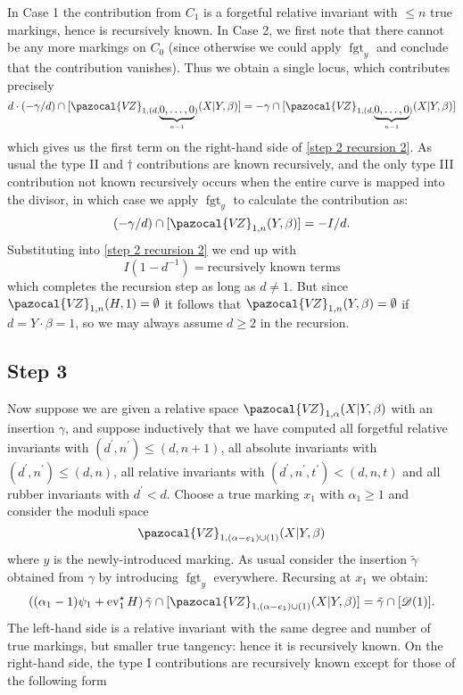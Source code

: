 \documentclass[11pt]{amsart}
\newcommand{\VZ}{\pazocal{V\!Z}}
\newcommand{\st}{\star}
\newcommand{\ev}{\operatorname{ev}}
\newcommand{\fgt}{\operatorname{fgt}}
\newcommand{\Dcal}{\mathcal{D}}
\theoremstyle{definition}
\theoremstyle{definition}
\providecommand{\DIFaddtex}[1]{{\protect\color{blue}\uwave{#1}}} %
\providecommand{\DIFaddbegin}{} %
\providecommand{\DIFaddend}{} %
\providecommand{\DIFadd}[1]{\texorpdfstring{\DIFaddtex{#1}}{#1}} %
\begin{document}
In Case 1 the contribution from $C_1$ is a forgetful relative invariant with $\leq n$ true markings, hence is recursively known. In Case 2, we first note that there cannot be any more markings on $C_0$ (since otherwise we could apply $\fgt_y$ and conclude that the contribution vanishes). Thus we obtain a single locus, which contributes precisely
\begin{equation*} d\cdot(-\gamma/d) \cap [\VZ_{1,(d,\underbrace{0,\ldots,0}_{n-1})}(X|Y,\beta)] = -\gamma\cap[\VZ_{1,(d,\underbrace{0,\ldots,0}_{n-1})}(X|Y,\beta)]\end{equation*}
which gives us the first term on the right-hand side of \eqref{step 2 recursion 2}. As usual the type II and $\dag$ contributions are known recursively, and the only type III contribution not known recursively occurs when the entire curve is mapped into the divisor, in which case we apply $\fgt_y$ to calculate the contribution as:
\begin{equation*} (-\gamma/d) \cap [\VZ_{1,n}(Y,\beta)] = -I/d.\end{equation*}
Substituting into \eqref{step 2 recursion 2} we end up with
\begin{equation*} I(1-d^{-1}) = \text{recursively known terms} \end{equation*}
which completes the recursion step as long as $d \neq 1$. But since $\VZ_{1,n}(H,1)=\emptyset$ \DIFaddbegin \DIFadd{as noted in Remark~\ref{rem: constant-maps}, }\DIFaddend it follows that $\VZ_{1,n}(Y,\beta)=\emptyset$ if $d=Y\cdot\beta=1$, so we may always assume $d \geq 2$ in the recursion.

\subsection*{Step 3} Now suppose we are given a relative space $\VZ_{1,\alpha}(X|Y,\beta)$ with an insertion $\gamma$, and suppose inductively that we have computed all forgetful relative invariants with $(d^\prime,n^\prime) \leq (d,n+1)$, all absolute invariants with $(d^\prime,n^\prime) \leq (d,n)$, all relative invariants with $(d^\prime,n^\prime,t^\prime)<(d,n,t)$ and all rubber invariants with $d^\prime < d$. Choose a true marking $x_1$ with $\alpha_1 \geq 1$ and consider the moduli space
\begin{equation*} \VZ_{1,(\alpha-e_1)\cup(1)}(X|Y,\beta) \end{equation*}
where $y$ is the newly-introduced marking. As usual consider the insertion $\tilde\gamma$ obtained from $\gamma$ by introducing $\fgt_y$ everywhere. Recursing at $x_1$ we obtain:
\begin{equation*} \left( (\alpha_1-1)\psi_1 + \ev_1^\st H\right) \tilde\gamma \cap [\VZ_{1,(\alpha-e_1)\cup(1)}(X|Y,\beta)] = \tilde\gamma \cap [\Dcal(1)].\end{equation*}
The left-hand side is a relative invariant with the same degree and number of true markings, but smaller true tangency: hence it is recursively known. On the right-hand side, the type I contributions are recursively known except for those of the following form
\end{document}
